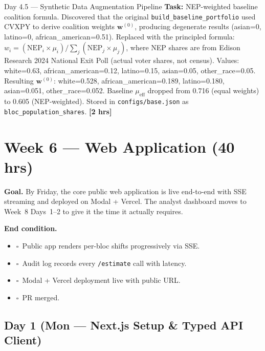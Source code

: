 \documentclass[11pt]{article}
\newcommand{\hrs}[1]{\textbf{[#1 hrs]}}
\newcommand{\dayhead}[2]{%
  \subsection*{Day #1 \normalfont\small\color{codegray}(#2)}}
\newcommand{\task}[2]{%
  \noindent\textbf{Task:} #1 \hfill \hrs{#2}\\}
\newcommand{\done}{\textcolor{sectionblue}{$\square$}\ }
\begin{document}
\begin{taskbox}{Day 4.5 --- Synthetic Data Augmentation Pipeline}
\task{NEP-weighted baseline coalition formula. Discovered that the
  original \texttt{build\_baseline\_portfolio} used CVXPY to derive
  coalition weights $\mathbf{w}^{(0)}$, producing degenerate results
  (asian=0, latino=0, african\_american=0.51). Replaced with the
  principled formula: $w_i = (\text{NEP}_i \times \mu_i) /
  \sum_j (\text{NEP}_j \times \mu_j)$, where NEP shares are from
  Edison Research 2024 National Exit Poll (actual voter shares, not
  census). Values: white=0.63, african\_american=0.12, latino=0.15,
  asian=0.05, other\_race=0.05. Resulting $\mathbf{w}^{(0)}$:
  white=0.528, african\_american=0.189, latino=0.180, asian=0.051,
  other\_race=0.052. Baseline $\mu_\text{eff}$ dropped from 0.716
  (equal weights) to 0.605 (NEP-weighted). Stored in
  \texttt{configs/base.json} as \texttt{bloc\_population\_shares}.}{2}

\end{taskbox}

\newpage

\section{Week 6 --- Web Application (40 hrs)}

\textbf{Goal.} By Friday, the core public web application is live end-to-end
with SSE streaming and deployed on Modal + Vercel. The analyst dashboard
moves to Week~8 Days~1--2 to give it the time it actually requires.

\textbf{End condition.}
\begin{itemize}[leftmargin=1.6em, itemsep=1pt]
  \item \done Public app renders per-bloc shifts progressively via SSE.
  \item \done Audit log records every \texttt{/estimate} call with latency.
  \item \done Modal + Vercel deployment live with public URL.
  \item \done PR merged.
\end{itemize}

\dayhead{1}{Mon --- Next.js Setup \& Typed API Client}
\end{document}
